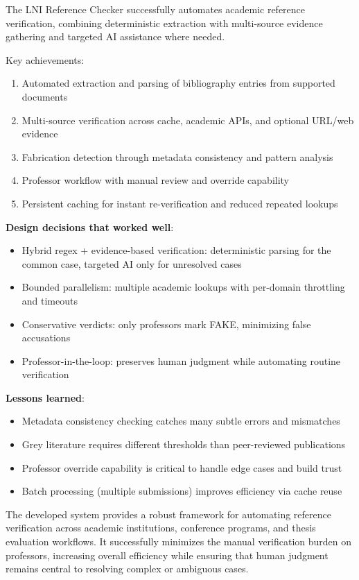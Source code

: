 \documentclass[12pt,a4paper,oneside]{report}
\begin{document}
The LNI Reference Checker successfully automates academic reference verification, combining deterministic extraction with multi-source evidence gathering and targeted AI assistance where needed. 

Key achievements:
\begin{enumerate}
    \item Automated extraction and parsing of bibliography entries from supported documents
    \item Multi-source verification across cache, academic APIs, and optional URL/web evidence
    \item Fabrication detection through metadata consistency and pattern analysis
    \item Professor workflow with manual review and override capability
    \item Persistent caching for instant re-verification and reduced repeated lookups
\end{enumerate}

\textbf{Design decisions that worked well}:
\begin{itemize}
    \item Hybrid regex + evidence-based verification: deterministic parsing for the common case, targeted AI only for unresolved cases
    \item Bounded parallelism: multiple academic lookups with per-domain throttling and timeouts
    \item Conservative verdicts: only professors mark FAKE, minimizing false accusations
    \item Professor-in-the-loop: preserves human judgment while automating routine verification
   
\end{itemize}

\textbf{Lessons learned}:
\begin{itemize}
    
    \item Metadata consistency checking catches many subtle errors and mismatches
    \item Grey literature requires different thresholds than peer-reviewed publications
    \item Professor override capability is critical to handle edge cases and build trust
    \item Batch processing (multiple submissions) improves efficiency via cache reuse
\end{itemize}

The developed system provides a robust framework for automating reference verification across academic institutions, conference programs, and thesis evaluation workflows. It successfully minimizes the manual verification burden on professors, increasing overall efficiency while ensuring that human judgment remains central to resolving complex or ambiguous cases.
\end{document}

